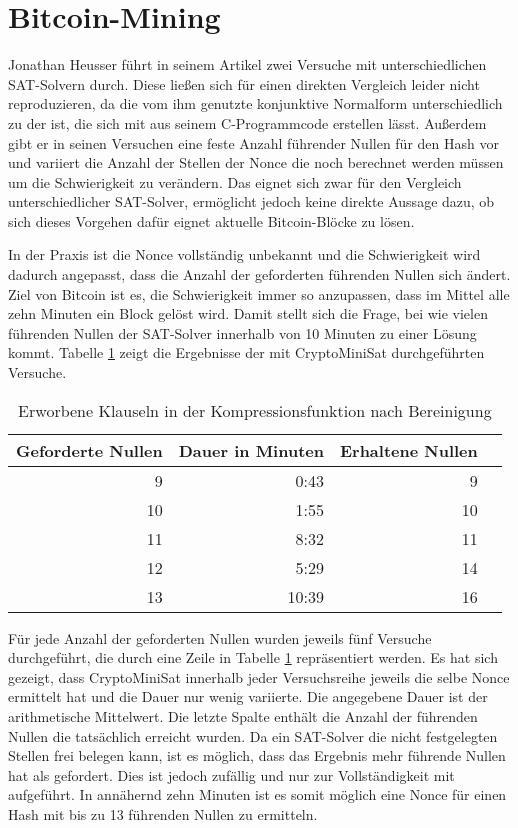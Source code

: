 \section{Bitcoin-Mining}

Jonathan Heusser führt in seinem Artikel \cite{jona:1} zwei Versuche mit unterschiedlichen SAT-Solvern durch.
Diese ließen sich für einen direkten Vergleich leider nicht reproduzieren, da die vom ihm genutzte konjunktive
Normalform unterschiedlich zu der ist, die sich mit  aus seinem C-Programmcode erstellen lässt.
Außerdem gibt er in seinen Versuchen eine feste Anzahl führender Nullen für den Hash vor und variiert die
Anzahl der Stellen der Nonce die noch berechnet werden müssen um die Schwierigkeit zu verändern. Das eignet
sich zwar für den Vergleich unterschiedlicher SAT-Solver, ermöglicht jedoch keine direkte Aussage dazu, ob
sich dieses Vorgehen dafür eignet aktuelle Bitcoin-Blöcke zu lösen.

In der Praxis ist die Nonce vollständig unbekannt und die Schwierigkeit wird dadurch angepasst, dass die Anzahl
der geforderten führenden Nullen sich ändert. Ziel von Bitcoin ist es, die Schwierigkeit immer so anzupassen, dass im Mittel
alle zehn Minuten ein Block gelöst wird. Damit stellt sich die Frage, bei wie vielen führenden Nullen der SAT-Solver
innerhalb von 10 Minuten zu einer Lösung kommt. Tabelle \ref{fig:bitcoinzeros} zeigt die Ergebnisse der mit CryptoMiniSat
durchgeführten Versuche.

\begin{table}[!h]
  \centering
  \begin{tabular}{rr|rr}
    Geforderte Nullen & Dauer in Minuten & Erhaltene Nullen \\
    \hline
     9 &  0:43 &  9 \\
    10 &  1:55 & 10 \\
    11 &  8:32 & 11 \\
    12 &  5:29 & 14 \\
    13 & 10:39 & 16
  \end{tabular}
  \caption{Erworbene Klauseln in der Kompressionsfunktion nach Bereinigung}
  \label{fig:bitcoinzeros}
\end{table}

Für jede Anzahl der geforderten Nullen wurden jeweils fünf Versuche durchgeführt, die durch eine Zeile in Tabelle \ref{fig:bitcoinzeros}
repräsentiert werden. Es hat sich gezeigt, dass CryptoMiniSat innerhalb jeder Versuchsreihe jeweils die selbe Nonce ermittelt hat
und die Dauer nur wenig variierte. Die angegebene Dauer ist der arithmetische Mittelwert. Die letzte Spalte enthält die Anzahl der
führenden Nullen die tatsächlich erreicht wurden. Da ein SAT-Solver die nicht festgelegten Stellen frei belegen kann, ist es möglich,
dass das Ergebnis mehr führende Nullen hat als gefordert. Dies ist jedoch zufällig und nur zur Vollständigkeit mit aufgeführt.
In annähernd zehn Minuten ist es somit möglich eine Nonce für einen Hash mit bis zu 13 führenden Nullen zu ermitteln.

